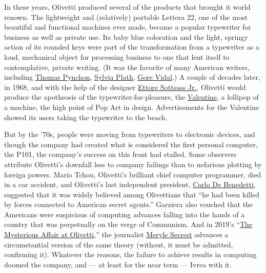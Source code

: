 In these years, Olivetti produced several of the products that brought
it world renown. The lightweight and (relatively) portable Lettera 22,
one of the most beautiful and functional machines ever made, became a
popular typewriter for business as well as private use. Its baby blue
coloration and the light, springy action of its rounded keys were part
of the transformation from a typewriter as a loud, mechanical object for
processing business to one that lent itself to contemplative, private
writing. (It was the favorite of many American writers, including
\href{https://www.nytimes.com/topic/person/thomas-pynchon}{Thomas
Pynchon},
\href{https://www.nytimes.com/topic/person/sylvia-plath}{Sylvia Plath},
\href{https://www.nytimes.com/topic/person/gore-vidal}{Gore Vidal}.) A
couple of decades later, in 1968, and with the help of the designer
\href{https://www.nytimes.com/2013/12/12/garden/rare-gems-from-ettore-sottsass.html}{Ettore
Sottsass Jr.}, Olivetti would produce the apotheosis of the
typewriter-for-pleasure, the
\href{https://www.metmuseum.org/art/collection/search/739409}{Valentine},
a lollipop of a machine, the high point of Pop Art in design.
Advertisements for the Valentine showed its users taking the typewriter
to the beach.

But by the '70s, people were moving from typewriters to electronic
devices, and though the company had created what is considered the first
personal computer, the P101, the company's success on this front had
stalled. Some observers attribute Olivetti's downfall less to company
failings than to nefarious plotting by foreign powers. Mario Tchou,
Olivetti's brilliant chief computer programmer, died in a car accident,
and Olivetti's last independent president,
\href{https://www.nytimes.com/1992/04/17/business/olivetti-s-chief-is-convicted-in-collapse-of-bank-in-1982.html}{Carlo
De Benedetti}, suggested that it was widely believed among Olivettians
that ``he had been killed by forces connected to American secret
agents.'' Garziera also vouched that the Americans were suspicious of
computing advances falling into the hands of a country that was
perpetually on the verge of Communism. And in 2019's
``\href{https://www.penguinrandomhouse.ca/books/544552/the-mysterious-affair-at-olivetti-by-meryle-secrest/9780451493651}{The
Mysterious Affair at Olivetti},'' the journalist
\href{https://www.penguinrandomhouse.com/authors/27553/meryle-secrest}{Meryle
Secrest} advances a circumstantial version of the same theory (without,
it must be admitted, confirming it). Whatever the reasons, the failure
to achieve results in computing doomed the company, and --- at least for
the near term --- Ivrea with it.

